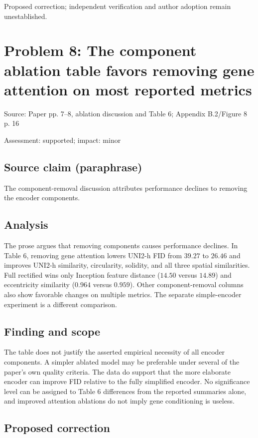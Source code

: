 \documentclass[11pt]{article}
\begin{document}
Proposed correction; independent verification and author adoption remain unestablished.

\section*{Problem 8: The component ablation table favors removing gene attention on most reported metrics}

Source: Paper pp. 7–8, ablation discussion and Table 6; Appendix B.2/Figure 8 p. 16

Assessment: supported; impact: minor

\subsection*{Source claim (paraphrase)}

The component-removal discussion attributes performance declines to removing the encoder components.

\subsection*{Analysis}

The prose argues that removing components causes performance declines. In Table 6, removing gene attention lowers UNI2-h FID from \(39.27\) to \(26.46\) and improves UNI2-h similarity, circularity, solidity, and all three spatial similarities. Full rectified wins only Inception feature distance (\(14.50\) versus \(14.89\)) and eccentricity similarity (\(0.964\) versus \(0.959\)). Other component-removal columns also show favorable changes on multiple metrics. The separate simple-encoder experiment is a different comparison.

\subsection*{Finding and scope}

The table does not justify the asserted empirical necessity of all encoder components. A simpler ablated model may be preferable under several of the paper's own quality criteria. The data do support that the more elaborate encoder can improve FID relative to the fully simplified encoder. No significance level can be assigned to Table 6 differences from the reported summaries alone, and improved attention ablations do not imply gene conditioning is useless.

\subsection*{Proposed correction}
\end{document}
